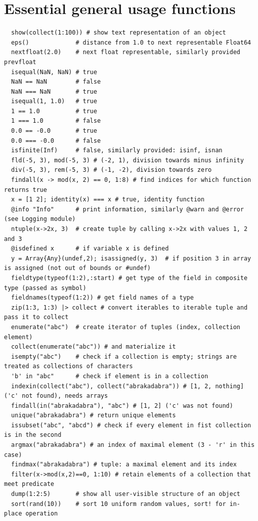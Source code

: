 \documentclass[10pt,a4paper]{article}
\begin{document}
\section{Essential general usage functions}
\begin{lstlisting}
  show(collect(1:100)) # show text representation of an object
  eps()             # distance from 1.0 to next representable Float64
  nextfloat(2.0)    # next float representable, similarly provided prevfloat
  isequal(NaN, NaN) # true
  NaN == NaN        # false
  NaN === NaN       # true
  isequal(1, 1.0)   # true
  1 == 1.0          # true
  1 === 1.0         # false
  0.0 == -0.0       # true
  0.0 === -0.0      # false
  isfinite(Inf)     # false, similarly provided: isinf, isnan
  fld(-5, 3), mod(-5, 3) # (-2, 1), division towards minus infinity
  div(-5, 3), rem(-5, 3) # (-1, -2), division towards zero
  findall(x -> mod(x, 2) == 0, 1:8) # find indices for which function returns true
  x = [1 2]; identity(x) === x # true, identity function
  @info "Info"      # print information, similarly @warn and @error (see Logging module)
  ntuple(x->2x, 3)  # create tuple by calling x->2x with values 1, 2 and 3
  @isdefined x      # if variable x is defined
  y = Array{Any}(undef,2); isassigned(y, 3)  # if position 3 in array is assigned (not out of bounds or #undef)
  fieldtype(typeof(1:2),:start) # get type of the field in composite type (passed as symbol)
  fieldnames(typeof(1:2)) # get field names of a type
  zip(1:3, 1:3) |> collect # convert iterables to iterable tuple and pass it to collect
  enumerate("abc")  # create iterator of tuples (index, collection element)
  collect(enumerate("abc")) # and materialize it
  isempty("abc")    # check if a collection is empty; strings are treated as collections of characters
  'b' in "abc"      # check if element is in a collection
  indexin(collect("abc"), collect("abrakadabra")) # [1, 2, nothing] ('c' not found), needs arrays
  findall(in("abrakadabra"), "abc") # [1, 2] ('c' was not found)
  unique("abrakadabra") # return unique elements
  issubset("abc", "abcd") # check if every element in fist collection is in the second
  argmax("abrakadabra") # an index of maximal element (3 - 'r' in this case)
  findmax("abrakadabra") # tuple: a maximal element and its index
  filter(x->mod(x,2)==0, 1:10) # retain elements of a collection that meet predicate
  dump(1:2:5)       # show all user-visible structure of an object
  sort(rand(10))    # sort 10 uniform random values, sort! for in-place operation
\end{lstlisting}
\end{document}
